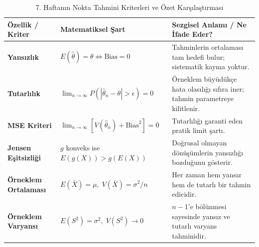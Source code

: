 \documentclass[11pt,a4paper]{article}
\begin{document}
\begin{table}[ht]
\centering
\small
\renewcommand{\arraystretch}{1.35}
\begin{tabularx}{\textwidth}{@{}l l X@{}}
\toprule
\textbf{Özellik / Kriter} & \textbf{Matematiksel Şart} & \textbf{Sezgisel Anlamı / Ne İfade Eder?} \\ \midrule
\textbf{Yansızlık} & $E(\hat{\theta}) = \theta \iff \text{Bias} = 0$ & Tahminlerin ortalaması tam hedefi bulur; sistematik kayma yoktur. \\
\textbf{Tutarlılık} & $\lim_{n \to \infty} P(|\hat{\theta}_n - \theta| > \epsilon) = 0$ & Örneklem büyüdükçe hata olasılığı sıfıra iner; tahmin parametreye kilitlenir. \\
\textbf{MSE Kriteri} & $\lim_{n \to \infty} [V(\hat{\theta}_n) + \text{Bias}^2] = 0$ & Tutarlılığı garanti eden pratik limit şartı. \\
\textbf{Jensen Eşitsizliği} & $g$ konveks ise $E(g(X)) > g(E(X))$ & Doğrusal olmayan dönüşümlerin yansızlığı bozduğunu gösterir. \\
\textbf{Örneklem Ortalaması} & $E(\bar{X}) = \mu, \; V(\bar{X}) = \sigma^2/n$ & Her zaman hem yansız hem de tutarlı bir tahmin edicidir. \\
\textbf{Örneklem Varyansı} & $E(S^2) = \sigma^2, \; V(S^2) \to 0$ & $n-1$'e bölünmesi sayesinde yansız ve tutarlı varyans tahminidir. \\ \bottomrule
\end{tabularx}
\caption{7. Haftanın Nokta Tahmini Kriterleri ve Özet Karşılaştırması}
\end{table}
\end{document}
